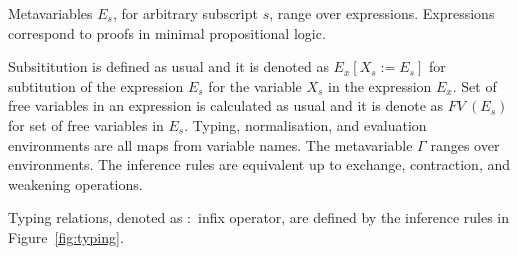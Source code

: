 \documentclass[11p,a4paper]{article}
\newcommand{\sbs}[3]{#1[#2:=#3]}
\newcommand{\fv}[1]{FV\ (#1)}
\begin{document}
Metavariables $E_s$, for arbitrary subscript $s$, range over
expressions. Expressions correspond to proofs in minimal propositional
logic.

Subsititution is defined as usual and it is denoted as
$\sbs{E_x}{X_s}{E_s}$ for subtitution of the expression $E_s$ for the
variable $X_s$ in the expression $E_x$. Set of free variables in an
expression is calculated as usual and it is denote as $\fv{E_s}$ for
set of free variables in $E_s$.
Typing, normalisation, and evaluation environments are all maps from
variable names. The metavariable $\Gamma$ ranges over environments.
The inference rules are equivalent up to exchange, contraction, and
weakening operations.

Typing relations, denoted as $:$ infix operator, are defined by
the inference rules in Figure~\ref{fig:typing}.
\end{document}
